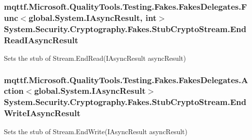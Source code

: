 \hypertarget{class_system_1_1_security_1_1_cryptography_1_1_fakes_1_1_stub_crypto_stream_aafd0c5a5584772dbd72efe3b71d7d7ee}{
\subsubsection[{End\-Read\-I\-Async\-Result}]{\setlength{\rightskip}{0pt plus 5cm}mqttf.\-Microsoft.\-Quality\-Tools.\-Testing.\-Fakes.\-Fakes\-Delegates.\-Func$<$global.\-System.\-I\-Async\-Result, int$>$ System.\-Security.\-Cryptography.\-Fakes.\-Stub\-Crypto\-Stream.\-End\-Read\-I\-Async\-Result}}\label{class_system_1_1_security_1_1_cryptography_1_1_fakes_1_1_stub_crypto_stream_aafd0c5a5584772dbd72efe3b71d7d7ee}


Sets the stub of Stream.\-End\-Read(\-I\-Async\-Result async\-Result)

\hypertarget{class_system_1_1_security_1_1_cryptography_1_1_fakes_1_1_stub_crypto_stream_a9585b3a7159cc2dfd9fc541719978603}{
\subsubsection[{End\-Write\-I\-Async\-Result}]{\setlength{\rightskip}{0pt plus 5cm}mqttf.\-Microsoft.\-Quality\-Tools.\-Testing.\-Fakes.\-Fakes\-Delegates.\-Action$<$global.\-System.\-I\-Async\-Result$>$ System.\-Security.\-Cryptography.\-Fakes.\-Stub\-Crypto\-Stream.\-End\-Write\-I\-Async\-Result}}\label{class_system_1_1_security_1_1_cryptography_1_1_fakes_1_1_stub_crypto_stream_a9585b3a7159cc2dfd9fc541719978603}


Sets the stub of Stream.\-End\-Write(\-I\-Async\-Result async\-Result)

